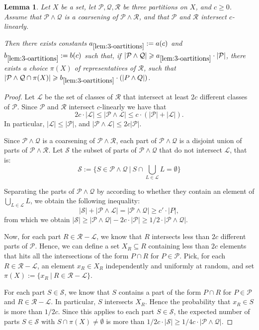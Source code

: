 \documentclass[11pt]{article}
\newtheorem{lemma}{Lemma}
\theoremstyle{definition}
\newcommand{\QQ}{{\mathcal Q}}
\newcommand{\PP}{{\mathcal P}}
\renewcommand{\le}{\leqslant}
\renewcommand{\ge}{\geqslant}
\renewcommand{\subset}{\subseteq}
\renewcommand{\cal}{\mathcal}
\newcommand{\Pp}{\mathcal{P}}
\newcommand{\Qq}{\mathcal{Q}}
\begin{document}
\begin{lemma}\label{lem:3-oartitions}
Let $X$ be a set, let $\PP, \Qq, \mathcal R$ be three partitions on $X$, and $c \ge 0$.
Assume that $\PP \wedge \QQ$ is a coarsening of $\PP \wedge \mathcal R$, and that $\PP$ and $\mathcal R$ intersect $c$-linearly.

Then there exists constants $a_{\ref{lem:3-oartitions}} := a(c)$ and $b_{\ref{lem:3-oartitions}} := b(c)$ such that, if $|\Pp \wedge \QQ| \ge a_{\ref{lem:3-oartitions}} \cdot |\PP|$, there exists a choice $\pi(X)$ of representatives of $\mathcal R$, such that $|\PP \wedge \QQ \cap \pi(X)| \ge b_{\ref{lem:3-oartitions}} \cdot (|P \wedge Q|)$.
\end{lemma}
\begin{proof}
Let $\cal L$ be the set of classes of $\cal R$ that intersect at least $2c$ different classes of $\PP$.
Since $\PP$ and $\cal R$ intersect $c$-linearly we have that
\[
2c \cdot |\mathcal{L}| \le |\PP \wedge \mathcal{L}| \le c \cdot (|\PP| + |\mathcal L|).
\]
In particular, $|\mathcal L| \le |\PP|$, and $|\PP \wedge \mathcal{L}| \le 2c |\PP|$. 

Since $\PP \wedge \QQ$ is a coarsening of $\PP \wedge \mathcal R$, each part of $\PP \wedge \QQ$ is a disjoint union of parts of $\PP \wedge \mathcal R$.
Let $\mathcal S$ the subset of parts of $\PP \wedge \QQ$ that do not intersect $\mathcal L$, that is:
\[
\mathcal S := \{ S \in \PP \wedge \QQ ~|~ S \cap \bigcup_{L \in \mathcal L} L = \emptyset \}
\]

Separating the parts of $\PP \wedge \QQ$ by according to whether they contain an element of $\bigcup_{L \in \mathcal L} L$, we obtain the following inequality:
\[
|\mathcal S| + |\PP \wedge \mathcal L| = |\PP \wedge \mathcal Q| \ge  c' \cdot |P|,
\]
from which we obtain $|\mathcal S| \ge |\PP \wedge \mathcal Q| - 2c \cdot |\mathcal P| \ge 1/2 \cdot |\PP \wedge \mathcal Q|$.

Now, for each part $R \in \mathcal R - \mathcal L$, we know that $R$ intersects less than $2c$ different parts of $\PP$.
Hence, we can define a set $X_R \subset R$ containing less than $2c$ elements that hits all the intersections of the form $P \cap R$ for $P \in \PP$.
Pick, for each $R \in \mathcal R - \mathcal L$, an element $x_R \in X_R$ independently and uniformly at random, and set $\pi(X) := \{ x_R ~|~ R \in \mathcal R - \mathcal L\}$.

For each part $S \in \mathcal S$, we know that $S$ contains a part of the form $P \cap R$ for $P \in \PP$ and $R \in \mathcal R - \mathcal L$. In particular, $S$ intersects $X_R$. Hence the probability that $x_R \in S$ is more than $1/2c$.
Since this applies to each part $S \in \mathcal S$, the expected number of parts $S \in \mathcal S$ with $S \cap \pi(X) \neq \emptyset$ is more than $1/2c \cdot |\mathcal S| \ge 1/4c \cdot |\PP \wedge \QQ|$.
\end{proof}
\end{document}
